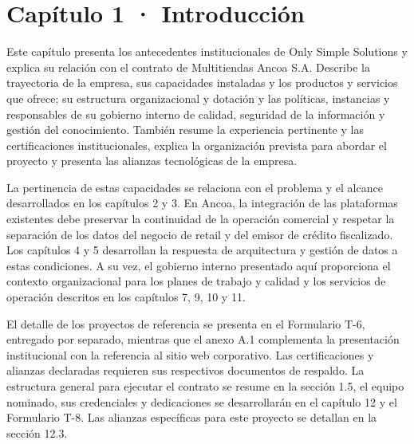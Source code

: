 \documentclass[11pt]{article}
\begin{document}
\renewcommand{\tablename}{Tabla}
\renewcommand{\thefigure}{1.\arabic{figure}}
\renewcommand{\thetable}{1.\arabic{table}}

\tableofcontents
\clearpage
\renewcommand{\listfigurename}{Lista de figuras}
\listoffigures
\clearpage
\renewcommand{\listtablename}{Lista de tablas}
\listoftables
\clearpage

\section{Capítulo 1 · Introducción}\label{capuxedtulo-1-introducciuxf3n}

Este capítulo presenta los antecedentes institucionales de Only Simple Solutions y explica su relación con el contrato de Multitiendas Ancoa S.A. Describe la trayectoria de la empresa, sus capacidades instaladas y los productos y servicios que ofrece; su estructura organizacional y dotación y las políticas, instancias y responsables de su gobierno interno de calidad, seguridad de la información y gestión del conocimiento. También resume la experiencia pertinente y las certificaciones institucionales, explica la organización prevista para abordar el proyecto y presenta las alianzas tecnológicas de la empresa.

La pertinencia de estas capacidades se relaciona con el problema y el alcance desarrollados en los capítulos 2 y 3. En Ancoa, la integración de las plataformas existentes debe preservar la continuidad de la operación comercial y respetar la separación de los datos del negocio de retail y del emisor de crédito fiscalizado. Los capítulos 4 y 5 desarrollan la respuesta de arquitectura y gestión de datos a estas condiciones. A su vez, el gobierno interno presentado aquí proporciona el contexto organizacional para los planes de trabajo y calidad y los servicios de operación descritos en los capítulos 7, 9, 10 y 11.

El detalle de los proyectos de referencia se presenta en el Formulario T-6, entregado por separado, mientras que el anexo A.1 complementa la presentación institucional con la referencia al sitio web corporativo. Las certificaciones y alianzas declaradas requieren sus respectivos documentos de respaldo. La estructura general para ejecutar el contrato se resume en la sección 1.5, el equipo nominado, sus credenciales y dedicaciones se desarrollarán en el capítulo 12 y el Formulario T-8. Las alianzas específicas para este proyecto se detallan en la sección 12.3.
\end{document}
